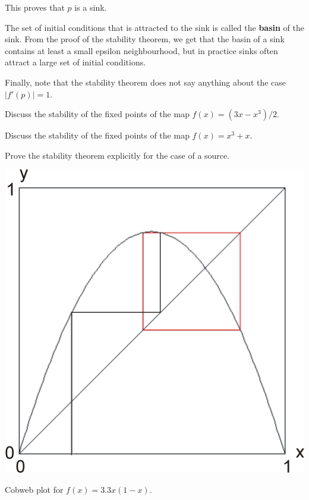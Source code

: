 This proves that $p$ is a sink.

The set of initial conditions that is attracted to the sink is called the \textbf{basin} of the sink. From the proof of the stability theorem, we get that the basin of a sink contains at least a small epsilon neighbourhood, but in practice sinks often attract a large set of initial conditions.

Finally, note that the stability theorem does not say anything about the case $|f'(p)|=1$.

\begin{exer}
Discuss the stability of the fixed points of the map $f(x) = (3x-x^3)/2$.
\end{exer}

\begin{exer}
Discuss the stability of the fixed points of the map $f(x) = x^3 + x$.
\end{exer}

\begin{exer}
Prove the stability theorem explicitly for the case of a source.
\end{exer}

\pagebreak


\begin{marginfigure}
\centering
\includegraphics{dynamic/figures/cobweb2}
\caption{Cobweb plot for $f(x)=3.3x(1-x)$.}
\label{fig-cobweb2}
\end{marginfigure}

